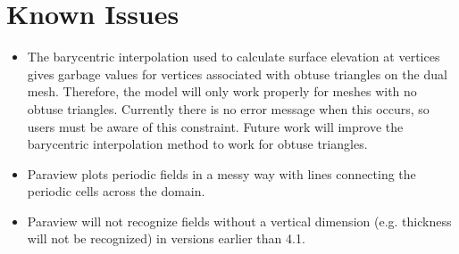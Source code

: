 \chapter{Known Issues}


\label{chap:knownissues}

\begin{itemize}
\item{The barycentric interpolation used to calculate surface elevation at vertices gives garbage values for vertices associated with obtuse triangles on the dual mesh.  Therefore, the model will only work properly for meshes with no obtuse triangles.  Currently there is no error message when this occurs, so users must be aware of this constraint.  Future work will improve the barycentric interpolation method to work for obtuse triangles. }

\item{Paraview plots periodic fields in a messy way with lines connecting the periodic cells across the domain.}

\item{Paraview will not recognize fields without a vertical dimension (e.g. thickness will not be recognized) in versions earlier than 4.1.}
\end{itemize}


